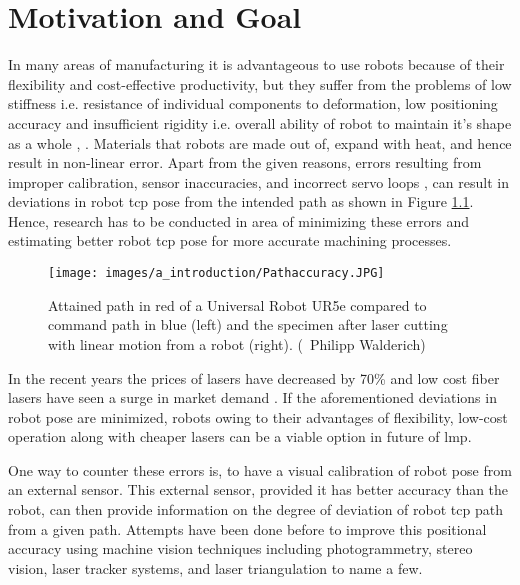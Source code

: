 \chapter{Motivation and Goal}\label{chap:motivation_and_goal}

In many areas of manufacturing it is advantageous to use robots because of their flexibility and cost-effective productivity, but they suffer from the problems of low stiffness i.e. resistance of individual components to deformation, low positioning accuracy and insufficient rigidity i.e. overall ability of robot to maintain it's shape as a whole \cite{ji}, \cite{chen}. Materials that robots are made out of, expand with heat, and hence result in non-linear error. Apart from the given reasons, errors resulting from improper calibration, sensor inaccuracies, and incorrect servo loops \cite{greenway}, \cite{torgny} can result in deviations in robot \Gls{tcp} pose from the intended path as shown in Figure \ref{fig:fig_walderich}. Hence, research has to be conducted in area of minimizing these errors and estimating better robot \Gls{tcp} pose for more accurate machining processes.

\vspace{5mm}

    \vspace{5mm}
    \begin{figure}[h]
        \centering
        \texttt{[image: images/a\_introduction/Pathaccuracy.JPG]}
        \caption{Attained path in red of a Universal Robot UR5e compared to command path in blue (left) and the specimen after laser cutting with linear motion from a robot (right). (\textcopyright \ Philipp Walderich) \cite{img_walderich}}
        \label{fig:fig_walderich}
    \end{figure}
    \vspace{5mm}

    \noindent In the recent years the prices of lasers have decreased by 70\% and low cost fiber lasers have seen a surge in market demand \cite{optech}. If the aforementioned deviations in robot pose are minimized, robots owing to their advantages of flexibility, low-cost operation along with cheaper lasers can be a viable option in future of \gls{lmp}.
    
    \vspace{5mm}

    \noindent One way to counter these errors is, to have a visual calibration of robot pose from an external sensor. This external sensor, provided it has better accuracy than the robot, can then provide information on the degree of deviation of robot \gls{tcp} path from a given path. Attempts have been done before to improve this positional accuracy using machine vision techniques including photogrammetry, stereo vision, laser tracker systems, and laser triangulation to name a few. 
    
